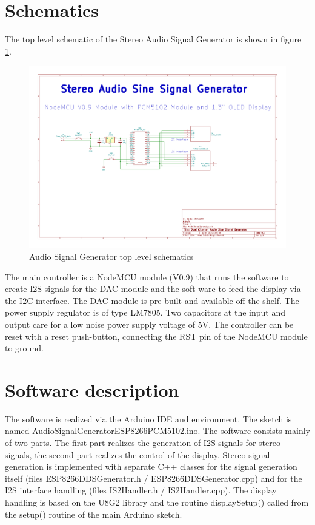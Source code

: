 \documentclass[11pt, oneside]{scrartcl}   	%
\begin{document}
\section{Schematics}
The top level schematic of the Stereo Audio Signal Generator is shown in figure \ref{fig:toplevelschematic}.
\begin{figure}[tbph]
	\centering
	\includegraphics[width=\linewidth]{AudioSignalGeneratorSchematics.pdf}
	\caption[Audio Signal Generator top level schematics]{Audio Signal Generator top level schematics}
	\label{fig:toplevelschematic}
\end{figure}
The main controller is a NodeMCU module (V0.9) that runs the software to create I2S signals for the DAC module and the soft
ware to feed the display via the I2C interface. The DAC module is pre-built and available off-the-shelf. The 
power supply regulator is of type LM7805. Two capacitors at the input and output care for a low noise power supply voltage of 5V. The controller can be reset with a reset push-button, connecting the RST pin of the NodeMCU module to ground.
\newpage

\section{Software description}
The software is realized via the Arduino IDE and environment. The sketch is named AudioSignalGeneratorESP8266PCM5102.ino.
The software consists mainly of two parts. The first part realizes the generation of I2S signals for stereo signals, the second part realizes the control of the display. Stereo signal generation is implemented with separate C++ classes for the signal generation itself (files ESP8266DDSGenerator.h / ESP8266DDSGenerator.cpp) and for the I2S interface handling (files IS2Handler.h / IS2Handler.cpp). The display handling is based on the U8G2 library and the routine displaySetup() called from the setup() routine of the main Arduino sketch.
\end{document}
